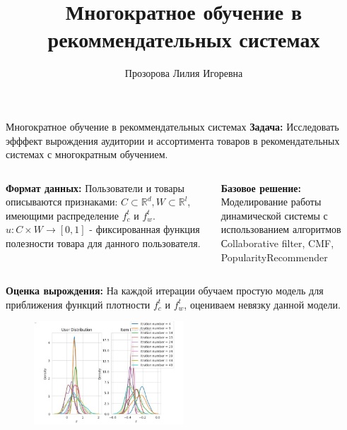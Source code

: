 \documentclass{beamer}
\title[\hbox to 56mm{Многократное обучение в рекоммендательных системах}]{Многократное обучение в рекоммендательных системах}
\author[Прозорова Л.\, И.]{Прозорова Лилия Игоревна}
\institute{}
\date{\footnotesize
\par\smallskip\emph{Руководитель:} Хританков Антон Сергеевич
\par\smallskip\emph{Консультант:} В.\,С.~Веприков
\par\bigskip\small 2024}
\begin{document}
\begin{frame}
\thispagestyle{empty}
\maketitle
\end{frame}
\begin{frame}{Многократное обучение в рекоммендательных системах}
\footnotesize \textbf{Задача:} Исследовать эфффект вырождения аудитории и ассортимента товаров в рекомендательных системах с многократным обучением.
\smallskip \smallskip
\begin{columns}[c]
    \scriptsize \textbf{Формат данных:} Пользователи и товары описываются признаками: $C \subset \mathbb{R}^d, W \subset \mathbb{R}^l$, имеющими распределение $f_c^t$ и $f_w^t$. $u : C \times W \rightarrow [0, 1]$ - фиксированная функция полезности товара для данного пользователя.
    
    \scriptsize \textbf{Базовое решение:} Моделирование работы динамической системы с использованием алгоритмов Сollaborative filter, CMF, PopularityRecommender

\end{columns}
\smallskip \smallskip 
\scriptsize \textbf{Оценка вырождения:} На каждой итерации обучаем простую модель для приближения функций плотности $f_c^t$ и $f_w^t$, оцениваем невязку данной модели.
\scriptsize
\begin{figure}
        \centering
        \includegraphics[width=0.50\textwidth]{distributions.jpg}
\end{figure}
\end{frame}
\end{document}
